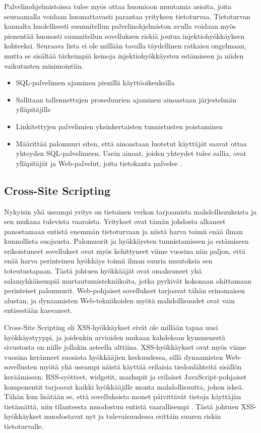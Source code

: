 Palvelinohjelmistoissa tulee myös ottaa huomioon muutamia asioita, joita seuraamalla voidaan huomattavasti parantaa yrityksen tietoturvaa.
Tietoturvan kannalta huolellisesti suunnitellun palvelinohjelmiston avulla voidaan myös pienentää huonosti suunnitellun sovelluksen riskiä joutua injektiohyökkäyksen kohteeksi. 
Seuraava lista ei ole millään tavalla täydellinen ratkaisu ongelmaan,
mutta se sisältää tärkeimpiä keinoja injektiohyökkäysten estämiseen ja
niiden vaikutusten minimointiin.

\begin{itemize}
\item SQL-palvelimen ajaminen pienillä käyttöoikeuksilla
\item Sallitaan tallennettujen proseduurien ajaminen ainoastaan järjestelmän ylläpitäjille
\item Linkitettyjen palvelimien yksinkertaisten tunnistusten poistaminen
\item Määrittää palomuuri siten, että ainoastaan luotetut käyttäjät saavat ottaa yhteyden SQL-palvelimeen. Usein ainoat, joiden yhteydet 
      tulee sallia, ovat ylläpitäjät ja Web-palvelut, joita tietokanta palvelee \cite{SQLSS}.
\end{itemize}


\subsection{Cross-Site Scripting}
Nykyisin yhä useampi yritys on tietoinen verkon tarjoamista mahdollisuuksista ja sen mukana tulevista vaaroista. Yritykset ovat tämän johdosta
alkaneet panostamaan entistä enemmän tietoturvaan ja niistä harva toimii enää ilman kunnollista suojausta. Palomuurit ja hyökkäysten tunnistamiseen
ja estämiseen erikoistuneet sovellukset ovat myös kehittyneet viime vuosina niin paljon, että enää harva perinteinen hyökkäys toimii ilman
suuria muutoksia sen toteutustapaan. Tästä johtuen hyökkääjät ovat omaksuneet yhä salamyhkäisempiä murtautumistekniikoita, jotka pyrkivät kokonaan
ohittamaan perinteiset palomuurit. Web-pohjaiset sovellukset tarjoavat tähän erinomaisen alustan, ja dynaamisten Web-tekniikoiden myötä mahdollisuudet 
ovat vain entisestään kasvaneet.

Cross-Site Scripting eli XSS-hyökkäykset eivät ole millään tapaa uusi hyökkäystyyppi, ja joidenkin arvioiden mukaan kahdeksan kymmenestä sivustosta on 
niille jollakin asteella alttiina. XSS-hyökkäykset ovat myös viime vuosina keränneet suosiota hyökkääjien keskuudessa, sillä dynaamisten Web-sovellusten
myötä yhä useampi näistä käyttää erilaisia tiedonlähteitä sisällön keräämiseen. RSS-\-syötteet, widgetit, mashupit ja erilaiset JavaScript-pohjaiset komponentit 
tarjoavat kaikki hyökkääjille monta mahdollisuutta, johon iskeä. Tähän kun lisätään se, että sovelluksista monet päivittävät tietoja käyttäjän tietämättä, 
niin tilanteesta muodostuu entistä vaarallisempi \cite{WEB2b}. Tästä johtuen XSS-hyökkäykset muodostavat nyt ja tulevaisuudessa erittäin suuren riskin
tietoturvalle.

